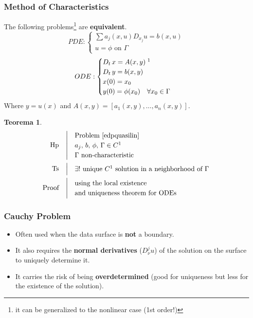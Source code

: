\documentclass[serif,notheorems]{beamer}
\makeatletter
\newenvironment{ipotesi}%
{\quad\left|\quad\def\arraystretch{1.2}\begin{array}{@{}l@{}}}%
{\end{array}\right.}
\newcommand{\hpthdim}[3]
{
\begin{align*}
\quad
\text{Hp}
&\begin{ipotesi} 
#1
\end{ipotesi}\\
\text{Ts}
&\begin{ipotesi}
#2
\end{ipotesi}\\
\text{Proof}
&\begin{ipotesi}
#3
\end{ipotesi}
\end{align*}
}
\theoremstyle{definition} %
\newtheorem{theorem}{Teorema}[section] %
\theoremstyle{remark}
\makeatother
\begin{document}
\begin{frame}
\frametitle{Method of Characteristics}
The following problems\footnote{it can be generalized to the nonlinear case (1st order!)} are \textbf{equivalent}.
\begin{equation} \label{edpquasilin}
PDE:
\begin{cases}
\sum a_j(x,u)D_{x_j} u = b(x,u)\\
u = \phi \text{ on } \Gamma
\end{cases} 
\end{equation}
\begin{equation}
ODE:
\begin{cases}
D_t \, x = A(x,y) \; \footnotemark \\
D_t \, y = b(x,y)\\ 
x(0)=x_0\\ 
y(0) = \phi (x_0) \quad \forall x_0 \in \Gamma
\end{cases} 
\end{equation}
Where $y = u(x)$ and $A(x,y)=[a_1(x,y),\ldots ,a_n(x,y)]$.
\end{frame}

\begin{frame}
\begin{theorem}
\hpthdim{
\text{Problem \eqref{edpquasilin} } \\
a_j, \, b, \, \phi , \, \Gamma \in C^1\\
\Gamma \text{ non-characteristic}
}{
\exists ! \text{ unique } C^1 \text{ solution in a neighborhood of } \Gamma
}
{
\text{using the local existence}\\ \text{and uniqueness theorem for ODEs}
}
\end{theorem}
\end{frame}

\begin{frame}
\frametitle{Cauchy Problem}
\begin{itemize}
\item Often used when the data surface is \textbf{not} a boundary.
\item It also requires the \textbf{normal derivatives} ($D^j_\nu u$) of the solution on the surface to uniquely determine it.
\item It carries the risk of being \textbf{overdetermined} (good for uniqueness but less for the existence of the solution).
\end{itemize}
\end{frame}
\end{document}
